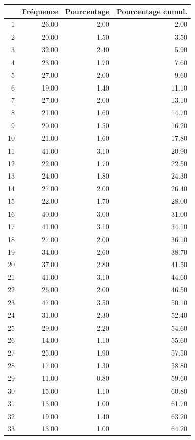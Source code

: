 \documentclass[12pt,english,french,twoside]{report}\usepackage[]{graphicx}\usepackage[]{color}
\begin{document}
\begin{table}[ht]
\centering
\begin{tabular}{rrrr}
  \hline
 & Fréquence & Pourcentage & Pourcentage cumul. \\ 
  \hline
1 & 26.00 & 2.00 & 2.00 \\ 
  2 & 20.00 & 1.50 & 3.50 \\ 
  3 & 32.00 & 2.40 & 5.90 \\ 
  4 & 23.00 & 1.70 & 7.60 \\ 
  5 & 27.00 & 2.00 & 9.60 \\ 
  6 & 19.00 & 1.40 & 11.10 \\ 
  7 & 27.00 & 2.00 & 13.10 \\ 
  8 & 21.00 & 1.60 & 14.70 \\ 
  9 & 20.00 & 1.50 & 16.20 \\ 
  10 & 21.00 & 1.60 & 17.80 \\ 
  11 & 41.00 & 3.10 & 20.90 \\ 
  12 & 22.00 & 1.70 & 22.50 \\ 
  13 & 24.00 & 1.80 & 24.30 \\ 
  14 & 27.00 & 2.00 & 26.40 \\ 
  15 & 22.00 & 1.70 & 28.00 \\ 
  16 & 40.00 & 3.00 & 31.00 \\ 
  17 & 41.00 & 3.10 & 34.10 \\ 
  18 & 27.00 & 2.00 & 36.10 \\ 
  19 & 34.00 & 2.60 & 38.70 \\ 
  20 & 37.00 & 2.80 & 41.50 \\ 
  21 & 41.00 & 3.10 & 44.60 \\ 
  22 & 26.00 & 2.00 & 46.50 \\ 
  23 & 47.00 & 3.50 & 50.10 \\ 
  24 & 31.00 & 2.30 & 52.40 \\ 
  25 & 29.00 & 2.20 & 54.60 \\ 
  26 & 14.00 & 1.10 & 55.60 \\ 
  27 & 25.00 & 1.90 & 57.50 \\ 
  28 & 17.00 & 1.30 & 58.80 \\ 
  29 & 11.00 & 0.80 & 59.60 \\ 
  30 & 15.00 & 1.10 & 60.80 \\ 
  31 & 13.00 & 1.00 & 61.70 \\ 
  32 & 19.00 & 1.40 & 63.20 \\ 
  33 & 13.00 & 1.00 & 64.20 \\ 

\end{tabular}
\end{table}
\end{document}
